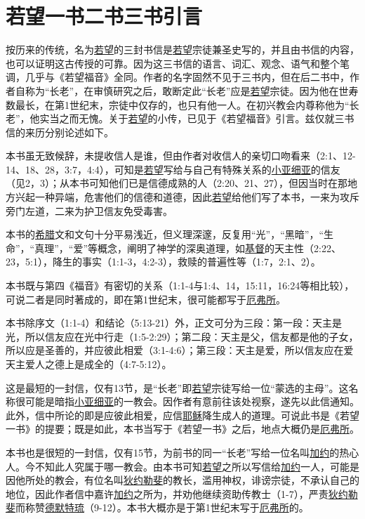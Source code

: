 \chapter*{若望一书二书三书引言}


按历来的传统，名为\uline{若望}的三封书信是\uline{若望}宗徒兼圣史写的，并且由书信的内容，也可以证明这古传授的可靠。因为这三书信的语言、词汇、观念、语气和整个笔调，几乎与《若望福音》全同。作者的名字固然不见于三书内，但在后二书中，作者自称为“长老”，在审慎研究之后，敢断定此“长老”应是\uline{若望}宗徒。因为他在世寿数最长，在第1世纪末，宗徒中仅存的，也只有他一人。在初兴教会内尊称他为“长老”，他实当之而无愧。关于\uline{若望}的小传，已见于《若望福音》引言。兹仅就三书信的来历分别论述如下。


本书虽无致候辞，未提收信人是谁，但由作者对收信人的亲切口吻看来（2:1、12-14、18、28，3:7，4:4），可知是\uline{若望}写给与自己有特殊关系的\uline{小亚细亚}的信友（见2，3）；从本书可知他们已是信德成熟的人（2:20、21、27），但因当时在那地方兴起一种异端，危害他们的信德和道德，因此\uline{若望}给他们写了本书，一来为攻斥旁门左道，二来为护卫信友免受毒害。

本书的\uline{希腊}文和文句十分平易浅近，但义理深邃，反复用“光”，“黑暗”，“生命”，“真理”，“爱”等概念，阐明了神学的深奥道理，如\uline{基督}的天主性（2:22、23，5:1），降生的事实（1:1-3，4:2-3），救赎的普遍性等（1:7，2:1、2）。

本书既与第四《福音》有密切的关系（1:1-4与1:4、14，15:11，16:24等相比较），可说二者是同时著成的，即在第1世纪末，很可能都写于\uline{厄弗所}。

本书除序文（1:1-4）和结论（5:13-21）外，正文可分为三段：第一段：天主是光，所以信友应在光中行走（1:5-2:29）；第二段：天主是父，信友都是他的子女，所以应是圣善的，并应彼此相爱（3:1-4:6）；第三段：天主是爱，所以信友应在爱天主爱人之德上是成全的（4:7-5:12）。


这是最短的一封信，仅有13节，是“长老”即\uline{若望}宗徒写给一位“蒙选的主母”。这名称很可能是暗指\uline{小亚细亚}的一教会。因作者有意前往该处视察，遂先以此信通知。此外，信中所论的即是应彼此相爱，应信\uline{耶稣}降生成人的道理。可说此书是《若望一书》的提要；既是如此，本书当写于《若望一书》之后，地点大概仍是\uline{厄弗所}。


本书也是很短的一封信，仅有15节，为前书的同一“长老”写给一位名叫\uline{加约}的热心人。今不知此人究属于哪一教会。由本书可知\uline{若望}之所以写信给\uline{加约}一人，可能是因他所处的教会，有位名叫\uline{狄约勒斐}的教长，滥用神权，诽谤宗徒，不承认自己的地位，因此作者信中嘉许\uline{加约}之所为，并劝他继续资助传教士（1-7），严责\uline{狄约勒斐}而称赞\uline{德默特琉}（9-12）。本书大概亦是于第1世纪末写于\uline{厄弗所}的。